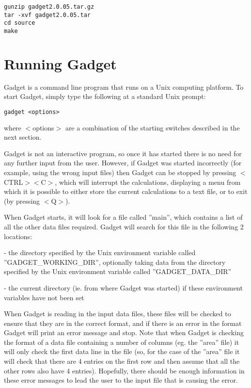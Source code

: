 \documentclass [a4paper, 10pt]{book}
\begin{document}
{\small\begin{verbatim}
gunzip gadget2.0.05.tar.gz
tar -xvf gadget2.0.05.tar
cd source
make
\end{verbatim}}

\section{Running Gadget}\label{sec:runninggadget}
Gadget is a command line program that runs on a Unix computing platform.  To start Gadget, simply type the following at a standard Unix prompt:

{\small\begin{verbatim}
gadget <options>
\end{verbatim}}

where $<$options$>$ are a combination of the starting switches described in the next section.

\bigskip
Gadget is not an interactive program, so once it has started there is no need for any further input from the user.  However, if Gadget was started incorrectly (for example, using the wrong input files) then Gadget can be stopped by pressing $<$CTRL$><$C$>$, which will interrupt the calculations, displaying a menu from which it is possible to either store the current calculations to a text file, or to exit (by pressing $<$Q$>$).

\bigskip
When Gadget starts, it will look for a file called ''main'', which contains a list of all the other data files required.  Gadget will search for this file in the following 2 locations:

 - the directory specified by the Unix environment variable called ''GADGET\_WORKING\_DIR'', optionally taking data from the directory specified by the Unix environment variable called ''GADGET\_DATA\_DIR''

 - the current directory (ie. from where Gadget was started) if these environment variables have not been set

\bigskip
When Gadget is reading in the input data files, these files will be checked to ensure that they are in the correct format, and if there is an error in the format Gadget will print an error message and stop.  Note that when Gadget is checking the format of a data file containing a number of columns (eg. the ''area'' file) it will only check the first data line in the file (so, for the case of the ''area'' file it will check that there are 4 entries on the first row and then assume that all the other rows also have 4 entries).  Hopefully, there should be enough information in these error messages to lead the user to the input file that is causing the error.
\end{document}
